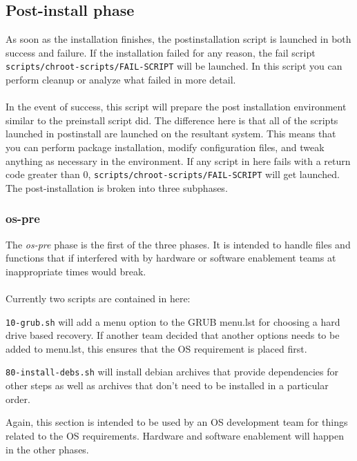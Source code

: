 \documentclass[letterpaper,10pt,titlepage]{article}
\begin{document}
\subsection{Post-install phase}
As soon as the installation finishes, the postinstallation script is launched in both success and failure.  If the installation failed for any reason, the fail script \texttt{scripts/chroot-scripts/FAIL-SCRIPT} will be launched.  In this script you can perform cleanup or analyze what failed in more detail.
\\
\\
In the event of success, this script will prepare the post installation environment similar to the preinstall script did.  The difference here is that all of the scripts launched in postinstall are launched on the resultant system.  This means that you can perform package installation, modify configuration files, and tweak anything as necessary in the environment.  If any script in here fails with a return code greater than 0, \texttt{scripts/chroot-scripts/FAIL-SCRIPT} will get launched.
\\
The post-installation is broken into three subphases.

\subsubsection{os-pre}
The \textit{os-pre} phase is the first of the three phases.  It is intended to handle files and functions that if interfered with by hardware or software enablement teams at inappropriate times would break.  
\\
\\
Currently two scripts are contained in here:
\begin{list}{}
\item \texttt{10-grub.sh} will add a menu option to the GRUB menu.lst for choosing a hard drive based recovery.  If another team decided that another options needs to be added to menu.lst, this ensures that the OS requirement is placed first. 
\item \texttt{80-install-debs.sh} will install debian archives that provide dependencies for other steps as well as archives that don't need to be installed in a particular order.
\\
\end{list}
Again, this section is intended to be used by an OS development team for things related to the OS requirements.  Hardware and software enablement will happen in the other phases.
\end{document}
